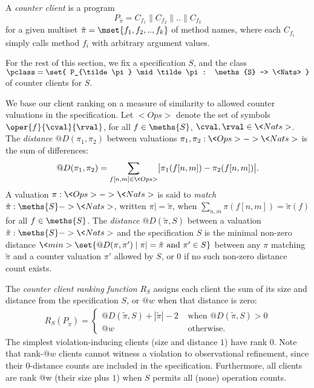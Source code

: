 \begin{definition}
  A \emph{counter client} is a program
  $$P_{\tilde\pi} = C_{f_1} \| C_{f_2} \| .. \| C_{f_k}$$
  for a given multiset $\tilde\pi = \mset{ f_1, f_2, .., f_k }$ of method names,
  where each $C_{f_i}$ simply calls method $f_i$ with arbitrary argument
  values.
\end{definition}

For the rest of this section, we fix a specification $S$, and the class
$\pclass = \set{ P_{\tilde\pi} \mid \tilde\pi : \meths{S} -> \<Nats> }$ of
counter clients for $S$.

We base our client ranking on a measure of similarity to allowed counter
valuations in the specification. Let $<Ops>$ denote the set of symbols $\oper{f}{\cval}{\rval}$,
for all $f\in\meths{S}$, $\cval,\rval\in\<Nats>$. The \emph{distance} $@D(\pi_1,\pi_2)$ between
valuations $\pi_1, \pi_2 : \<Ops> -> \<Nats>$ is the sum of differences:
\begin{align*}
  @D(\pi_1, \pi_2) = 
    \sum_{f[n,m] \in \<Ops>} \bigl| \pi_1(f[n,m]) - \pi_2(f[n,m]) \bigr|.
\end{align*}
A valuation $\pi : \<Ops> -> \<Nats>$ is said to \emph{match} $\tilde\pi :
\meths{S}-> \<Nats>$, written $\pi |= \tilde\pi$, when $\sum_{n,m} \pi(f[n,m])
= \tilde\pi(f)$ for all $f \in \meths{S}$.
The \emph{distance} $@D(\tilde\pi,S)$ between a valuation $\tilde\pi :
\meths{S} -> \<Nats>$ and the specification $S$ is the minimal non-zero
distance $\<min>\set{ @D(\pi,\pi') \mid \pi |= \tilde\pi \text{ and } \pi' \in
S}$ between any $\pi$ matching $\tilde\pi$ and a counter valuation $\pi'$
allowed by $S$, or $0$ if no such non-zero distance count exists.

The \emph{counter client ranking function} $R_S$ assigns each client
the sum of its size and distance from the specification $S$, or $@w$ when that
distance is zero:
\begin{align*}
  R_S( P_{\tilde\pi} ) = \left\{
  \begin{array}{ll}
    @D(\tilde\pi,S) + |\tilde\pi| - 2
    & \text{ when } @D(\tilde\pi,S) > 0 \\
    @w 
    & \text{ otherwise. }
  \end{array}
  \right.
\end{align*}
The simplest violation-inducing clients (\ie size and distance $1$) have rank
$0$. Note that rank-$@w$ clients cannot witness a violation to observational
refinement, since their 0-distance counts are included in the 
specification. Furthermore, all clients are rank @w (\resp their size plus $1$)
when $S$ permits all (\resp none) operation counts.

